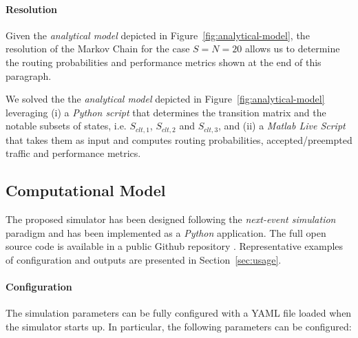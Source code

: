 \paragraph{Resolution}
Given the \textit{analytical model} depicted in Figure~\ref{fig:analytical-model}, the resolution of the Markov Chain for the case $S=N=20$ allows us to determine the routing probabilities and performance metrics shown at the end of this paragraph.

We solved the the \textit{analytical model} depicted in Figure~\ref{fig:analytical-model} leveraging (i) a \textit{Python script} that determines the transition matrix and the notable subsets of states, i.e. $S_{clt,1}$, $S_{clt,2}$ and $S_{clt,3}$, and (ii) a \textit{Matlab Live Script} that takes them as input and computes routing probabilities, accepted/preempted traffic and performance metrics.



\subsection{Computational Model}
The proposed simulator has been designed following the \textit{next-event simulation} paradigm and has been implemented as a \textit{Python} application. The full open source code is available in a public Github repository \cite{gmarciani-pydes}.
Representative examples of configuration and outputs are presented in Section~\ref{sec:usage}.

\paragraph{Configuration}
The simulation parameters can be fully configured with a YAML file loaded when the simulator starts up. In particular, the following parameters can be configured:

